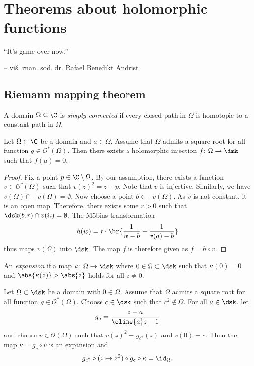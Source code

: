 \section{Theorems about holomorphic functions}

\epigraph{``It's game over now.''}{-- viš. znan. sod. dr. Rafael
Benedikt Andrist}

\subsection{Riemann mapping theorem}


\begin{definicija}
A domain $\Omega \subseteq \C$ is
\emph{simply connected} if every closed
path in $\Omega$ is homotopic to a constant path in $\Omega$.
\end{definicija}

\begin{lema}
\label{thm_hol:lm:inj_exis}
Let $\Omega \subset \C$ be a domain and $a \in \Omega$. Assume that
$\Omega$ admits a square root for all function
$g \in \mathcal{O}^*(\Omega)$. Then there exists a holomorphic
injection $f \colon \Omega \to \dsk$ such that $f(a) = 0$.
\end{lema}

\begin{proof}
Fix a point $p \in \C \setminus \Omega$. By our assumption, there
exists a function $v \in \mathcal{O}^*(\Omega)$ such that
$v(z)^2 = z-p$. Note that $v$ is injective. Similarly, we have
$v(\Omega) \cap -v(\Omega) = \emptyset$. Now choose a point
$b \in -v(\Omega)$. As $v$ is not constant, it is an open map.
Therefore, there exists some $r > 0 $ such that
$\dsk(b, r) \cap v(\Omega) = \emptyset$. The Möbius transformation
\[
h(w) = r \cdot \br{\frac{1}{w-b} - \frac{1}{v(a)-b}}
\]
thus maps $v(\Omega)$ into $\dsk$. The map $f$ is therefore given
as $f = h \circ v$.
\end{proof}

\begin{definicija}
An \emph{expansion} if a map
$\kappa \colon \Omega \to \dsk$ where $0 \in \Omega \subset \dsk$
such that $\kappa(0) = 0$ and $\abs{\kappa(z)} > \abs{z}$ holds for
all $z \ne 0$.
\end{definicija}

\begin{lema}
Let $\Omega \subset \dsk$ be a domain with $0 \in \Omega$. Assume
that $\Omega$ admits a square root for all function
$g \in \mathcal{O}^*(\Omega)$. Choose $c \in \dsk$ such that
$c^2 \not \in \Omega$. For all $a \in \dsk$, let
\[
g_a = \frac{z - a}{\oline{a} z - 1}
\]
and choose $v \in \mathcal{O}(\Omega)$ such that
$v(z)^2 = g_{c^2}(z)$ and $v(0) = c$. Then the map
$\kappa = g_c \circ v$ is an expansion and
\[
g_{c^2} \circ (z \mapsto z^2) \circ g_c \circ \kappa =
\id_{\Omega}.
\]
\end{lema}


